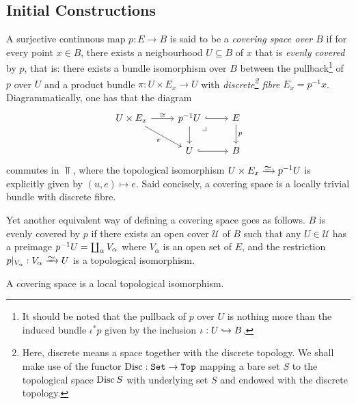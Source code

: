 \subsection{Initial Constructions}

\begin{definition}
    \label{def:covering-space}
    A surjective continuous map \(p: E \to B\) is said to be a \emph{covering space
        over \(B\)} if for every point \(x \in B\), there exists a neigbourhood
    \(U \subseteq B\) of \(x\) that is \emph{evenly covered} by \(p\), that is:
    there exists a bundle isomorphism over \(B\) between the pullback\footnote{It
        should be noted that the pullback of \(p\) over \(U\) is nothing more than the
        induced bundle \(\iota^{*} p\) given by the inclusion \(\iota: U \hookrightarrow B\).} of
    \(p\) over \(U\) and a product bundle \(\pi: U \times E_x \to U\) with
    \emph{discrete\footnote{Here, discrete means a space together with the discrete
            topology. We shall make use of the functor \(\operatorname{Disc}: {\texttt{Set}} \to {\texttt{Top}}\) mapping
            a bare set \(S\) to the topological space \(\operatorname{Disc} S\) with underlying set
            \(S\) and endowed with the discrete topology.} fibre}
    \(E_x = p^{-1} x\). Diagrammatically, one has that the diagram
    \[
        \begin{tikzcd}
            U \times E_x \ar[r, "\dis"] \ar[rd, "\pi"']
            &p^{-1} U \ar[r, hook] \ar[d]
            \ar[rd, "\lrcorner", phantom, very near start]
            &E \ar[d, "p"] \\
            &U \ar[r, hook] &B
        \end{tikzcd}
    \]
    commutes in \(\Top\), where the topological isomorphism
    \(U \times E_x \isoto p^{-1} U\) is explicitly given by \((u, e) \mapsto
    e\). Said concisely, a covering space is a locally trivial bundle with discrete
    fibre.

    Yet another equivalent way of defining a covering space goes as follows. \(B\) is
    evenly covered by \(p\) if there exists an open cover \(\mathcal{U}\) of \(B\)
    such that any \(U \in \mathcal{U}\) has a preimage \(p^{-1} U = \coprod_{\alpha}
    V_{\alpha}\) where \(V_{\alpha}\) is an open set of \(E\), and the restriction
    \(p|_{V_{\alpha}}: V_{\alpha} \isoto U\) is a topological isomorphism.
\end{definition}

\begin{corollary}
    \label{cor:covering-space-is-locally-top-iso}
    A covering space is a local topological isomorphism.
\end{corollary}

